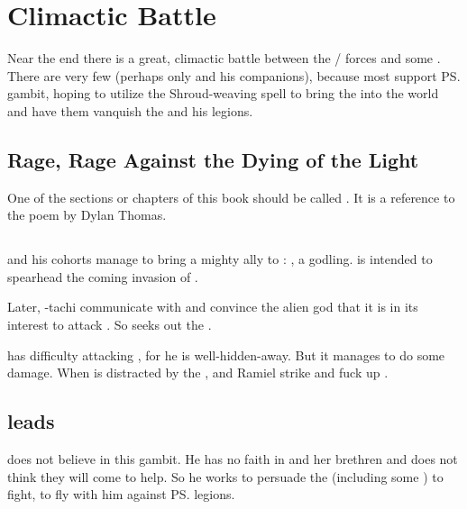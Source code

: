 \section{Climactic Battle}
Near the end there is a great, climactic battle between the \bane/\resphan{} forces and some . 
There are very few \dragons{} (perhaps only \Ishnaruchaefir{} and his companions), because most \dragons{} support \ps{\Secherdamon} gambit, hoping to utilize the \pps{\banes}{} Shroud-weaving spell to bring the \firstgendragons{} into the world and have them vanquish the \Voidbringer{} and his legions.







\subsection{Rage, Rage Against the Dying of the Light}
One of the sections or chapters of this book should be called .
It is a reference to the poem  by Dylan Thomas.







\subsection{\HothNrul}
\Vizsherioch{} and his cohorts manage to bring a mighty ally to \Miith: 
, a \xsic{} godling. 
\HothNrul{} is intended to spearhead the coming \xs{} invasion of \Miith. 

Later, \Ishnaruchaefir-tachi communicate with \HothNrul{} and convince the alien god that it is in its interest to attack \Daggerrain.
So \HothNrul{} seeks out the \banelord. 

\HothNrul{} has difficulty attacking \Daggerrain, for he is well-hidden-away. 
But it manages to do some damage. 
When \Daggerrain{} is distracted by the \xs{}, \Azraid{} and Ramiel strike and fuck up \Daggerrain. 







\subsection{\Ishnaruchaefir leads \dragons}
\Ishnaruchaefir{} does not believe in this gambit. He has no faith in \Tiamat{} and her brethren and does not think they will come to help. 
So he works to persuade the \dragons{} (including some ) to fight, to fly with him against \ps{\Daggerrain}{} legions. 

